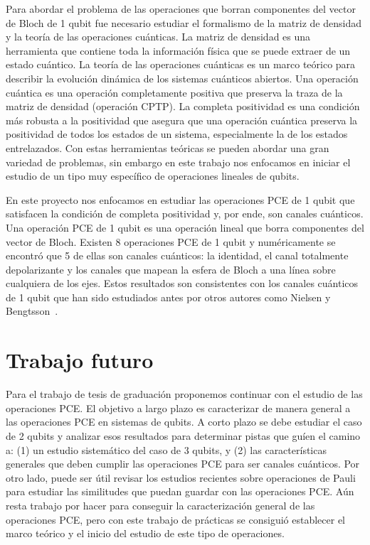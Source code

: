 Para abordar el problema de las operaciones que borran componentes 
del vector de Bloch de 1 qubit fue necesario estudiar el formalismo de 
la matriz de densidad y la teoría de las operaciones cuánticas. 
La matriz de densidad es una herramienta que contiene toda la información 
física que se puede extraer de un estado cuántico. La teoría de las 
operaciones cuánticas es un marco teórico para describir 
la evolución dinámica de los sistemas cuánticos abiertos. 
Una operación cuántica es una operación completamente positiva 
que preserva la traza de la matriz de densidad (operación CPTP).
La completa positividad es una condición más robusta a la positividad 
que asegura que una operación cuántica preserva la positividad de todos 
los estados de un sistema, especialmente la de los estados entrelazados.
Con estas herramientas teóricas se pueden abordar una gran variedad
de problemas, sin embargo en este trabajo nos enfocamos en iniciar el 
estudio de un tipo muy específico de operaciones lineales de qubits.

En este proyecto nos enfocamos en estudiar las operaciones PCE 
de 1 qubit que satisfacen la condición de completa positividad
y, por ende, son canales cuánticos. Una operación PCE 
de 1 qubit es una operación lineal que borra componentes del 
vector de Bloch. Existen 8 operaciones PCE de 1 qubit y 
numéricamente se encontró que 5 de ellas son 
canales cuánticos: la identidad, el canal totalmente depolarizante 
y los canales que mapean la esfera de Bloch a una línea sobre 
cualquiera de los ejes. Estos resultados son consistentes 
con los canales cuánticos de 1 qubit que han sido estudiados antes 
por otros autores como Nielsen y
Bengtsson~\cite{bengtsson_zyczkowski_2017,nielsen_chuang_2011}.

\section{Trabajo futuro}
Para el trabajo de tesis de graduación proponemos continuar con el
estudio de las operaciones PCE. El objetivo a largo plazo es caracterizar
de manera general a las operaciones PCE en sistemas de qubits. 
A corto plazo se debe estudiar el caso de 2 qubits y analizar esos 
resultados para determinar pistas que guíen el camino a: (1) un
estudio sistemático del caso de 3 qubits, y (2) las características generales
que deben cumplir las operaciones PCE para ser canales cuánticos.
Por otro lado, puede ser útil revisar los estudios recientes sobre operaciones
de Pauli para estudiar las similitudes que puedan guardar con las operaciones 
PCE. Aún resta trabajo por hacer para conseguir la caracterización general
de las operaciones PCE, pero con este trabajo de prácticas se consiguió 
establecer el marco teórico y el inicio del estudio de este tipo de operaciones.

